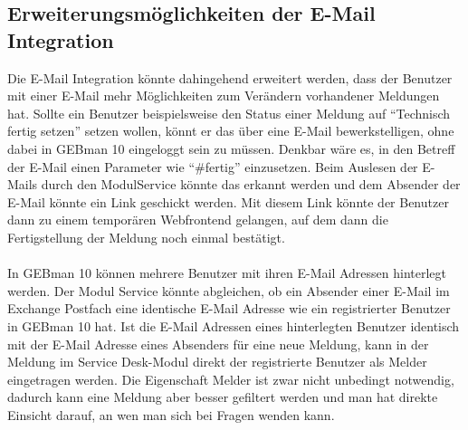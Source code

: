 \subsection{Erweiterungsmöglichkeiten der E-Mail Integration}
\noindent
Die E-Mail Integration könnte dahingehend erweitert werden, dass der Benutzer mit einer E-Mail mehr Möglichkeiten zum Verändern vorhandener Meldungen hat. Sollte ein Benutzer beispielsweise den Status einer Meldung auf \enquote{Technisch fertig setzen} setzen wollen, könnt er das über eine E-Mail bewerkstelligen, ohne dabei in GEBman 10 eingeloggt sein zu müssen. Denkbar wäre es, in den Betreff der E-Mail einen Parameter wie \enquote{\#fertig} einzusetzen. Beim Auslesen der E-Mails durch den ModulService könnte das erkannt werden und dem Absender der E-Mail könnte ein Link geschickt werden. Mit diesem Link könnte der Benutzer dann zu einem temporären Webfrontend gelangen, auf dem dann die Fertigstellung der Meldung noch einmal bestätigt.\\\\
\noindent
In GEBman 10 können mehrere Benutzer mit ihren E-Mail Adressen hinterlegt werden. Der Modul Service könnte abgleichen, ob ein Absender einer E-Mail im Exchange Postfach eine identische E-Mail Adresse wie ein registrierter Benutzer in GEBman 10 hat. Ist die E-Mail Adressen eines hinterlegten Benutzer identisch mit der E-Mail Adresse eines Absenders für eine neue Meldung, kann in der Meldung im Service Desk-Modul direkt der registrierte Benutzer als Melder eingetragen werden. Die Eigenschaft Melder ist zwar nicht unbedingt notwendig, dadurch kann eine Meldung aber besser gefiltert werden und man hat direkte Einsicht darauf, an wen man sich bei Fragen wenden kann.


